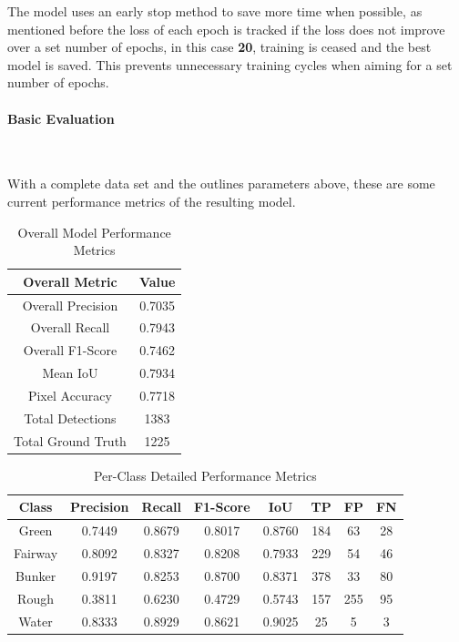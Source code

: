 \documentclass[final]{cmpreport_02}
\begin{document}
The model uses an early stop method to save more time when possible, as mentioned before the loss of each epoch is tracked if the loss does not improve over a set number of epochs, in this case \textbf{20}, training is ceased and the best model is saved.
This prevents unnecessary training cycles when aiming for a set number of epochs.


\paragraph{Basic Evaluation} \

With a complete data set and the outlines parameters above, these are some current performance metrics of the resulting model.

\begin{table}[H]
\centering
\begin{tabular}{c|c}
\hline
\textbf{Overall Metric} & \textbf{Value} \\
\hline
\hline
Overall Precision & 0.7035 \\
Overall Recall & 0.7943 \\
Overall F1-Score & 0.7462 \\
Mean IoU & 0.7934 \\
Pixel Accuracy & 0.7718 \\
Total Detections & 1383 \\
Total Ground Truth & 1225 \\
\hline
\end{tabular}
\caption{Overall Model Performance Metrics}
\label{tab:overall_metrics}
\end{table}


\begin{table}[H]
\centering
\begin{tabular}{c|c|c|c|c|c|c|c}
\hline
\textbf{Class} & \textbf{Precision} & \textbf{Recall} & \textbf{F1-Score} & \textbf{IoU} & \textbf{TP} & \textbf{FP} & \textbf{FN} \\
\hline
\hline
Green & 0.7449 & 0.8679 & 0.8017 & 0.8760 & 184 & 63 & 28 \\
Fairway & 0.8092 & 0.8327 & 0.8208 & 0.7933 & 229 & 54 & 46 \\
Bunker & 0.9197 & 0.8253 & 0.8700 & 0.8371 & 378 & 33 & 80 \\
Rough & 0.3811 & 0.6230 & 0.4729 & 0.5743 & 157 & 255 & 95 \\
Water & 0.8333 & 0.8929 & 0.8621 & 0.9025 & 25 & 5 & 3 \\
\hline
\end{tabular}
\caption{Per-Class Detailed Performance Metrics}
\label{tab:class_metrics}
\end{table}
\end{document}
